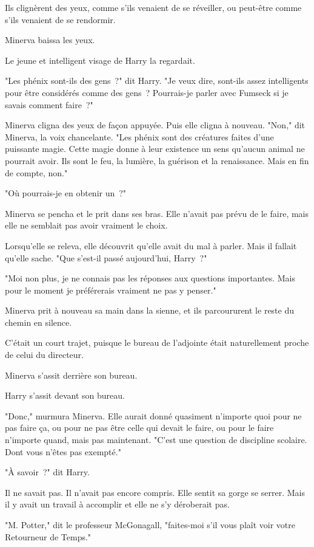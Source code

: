 Ils clignèrent des yeux, comme s'ils venaient de se réveiller, ou peut-être comme s'ils venaient de se rendormir.

Minerva baissa les yeux.

Le jeune et intelligent visage de Harry la regardait.

"Les phénix sont-ils des gens~?" dit Harry. "Je veux dire, sont-ils assez intelligents pour être considérés comme des gens~? Pourrais-je parler avec Fumseck si je savais comment faire~?"

Minerva cligna des yeux de façon appuyée. Puis elle cligna à nouveau. "Non," dit Minerva, la voix chancelante. "Les phénix sont des créatures faites d'une puissante magie. Cette magie donne à leur existence un sens qu'aucun animal ne pourrait avoir. Ils sont le feu, la lumière, la guérison et la renaissance. Mais en fin de compte, non."

"Où pourrais-je en obtenir un~?"

Minerva se pencha et le prit dans ses bras. Elle n'avait pas prévu de le faire, mais elle ne semblait pas avoir vraiment le choix.

Lorsqu'elle se releva, elle découvrit qu'elle avait du mal à parler. Mais il fallait qu'elle sache. "Que s'est-il passé aujourd'hui, Harry~?"

"Moi non plus, je ne connais pas les réponses aux questions importantes. Mais pour le moment je préférerais vraiment ne pas y penser."

Minerva prit à nouveau sa main dans la sienne, et ils parcoururent le reste du chemin en silence.

C'était un court trajet, puisque le bureau de l'adjointe était naturellement proche de celui du directeur.

Minerva s'assit derrière son bureau.

Harry s'assit devant son bureau.

"Donc," murmura Minerva. Elle aurait donné quasiment n'importe quoi pour ne pas faire ça, ou pour ne pas être celle qui devait le faire, ou pour le faire n'importe quand, mais pas maintenant. "C'est une question de discipline scolaire. Dont vous n'êtes pas exempté."

"À savoir~?" dit Harry.

Il ne savait pas. Il n'avait pas encore compris. Elle sentit sa gorge se serrer. Mais il y avait un travail à accomplir et elle ne s'y déroberait pas.

"M. Potter," dit le professeur McGonagall, "faites-moi s'il vous plaît voir votre Retourneur de Temps."

